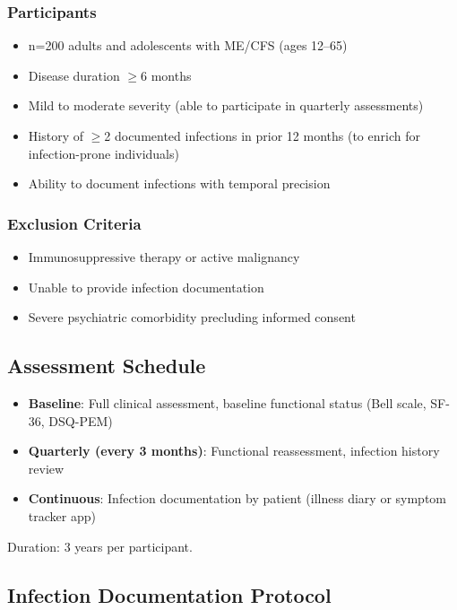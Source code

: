 \subsubsection{Participants}
\begin{itemize}
    \item n=200 adults and adolescents with ME/CFS (ages 12--65)
    \item Disease duration $\geq$6 months
    \item Mild to moderate severity (able to participate in quarterly assessments)
    \item History of $\geq$2 documented infections in prior 12 months (to enrich for infection-prone individuals)
    \item Ability to document infections with temporal precision
\end{itemize}

\subsubsection{Exclusion Criteria}
\begin{itemize}
    \item Immunosuppressive therapy or active malignancy
    \item Unable to provide infection documentation
    \item Severe psychiatric comorbidity precluding informed consent
\end{itemize}

\subsection{Assessment Schedule}

\begin{itemize}
    \item \textbf{Baseline}: Full clinical assessment, baseline functional status (Bell scale, SF-36, DSQ-PEM)
    \item \textbf{Quarterly (every 3 months)}: Functional reassessment, infection history review
    \item \textbf{Continuous}: Infection documentation by patient (illness diary or symptom tracker app)
\end{itemize}

Duration: 3 years per participant.

\subsection{Infection Documentation Protocol}

